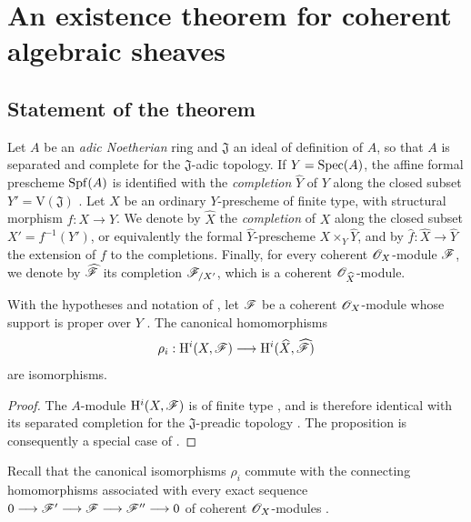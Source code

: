 \section{An existence theorem for coherent algebraic sheaves}
\label{section:III.5}


\subsection{Statement of the theorem}
\label{subsection:III.5.1}

\begin{env}[5.1.1]
\label{III.5.1.1}
Let $A$ be an \emph{adic Noetherian} ring and $\mathfrak{J}$ an ideal of
definition of $A$, so that $A$ is separated and complete for the
$\mathfrak{J}$-adic topology.  If $Y=\operatorname{Spec}(A)$, the affine formal
prescheme $\operatorname{Spf}(A)$ is identified with the \emph{completion}
$\widehat{Y}$ of $Y$ along the closed subset
$Y'=\mathrm{V}(\mathfrak{J})$ .  Let $X$ be an
ordinary $Y$-prescheme of finite type, with structural morphism
$f:X\to Y$.  We denote by $\widehat{X}$ the \emph{completion} of $X$ along
the closed subset $X'=f^{-1}(Y')$, or equivalently the formal
$\widehat{Y}$-prescheme $X\times_Y\widehat{Y}$, and by
$\widehat{f}:\widehat{X}\to\widehat{Y}$ the extension of $f$ to the
completions.  Finally, for every coherent $\mathscr{O}_X$-module
$\mathscr{F}$, we denote by $\widehat{\mathscr{F}}$ its completion
$\mathscr{F}_{/X'}$, which is a coherent
$\mathscr{O}_{\widehat{X}}$-module.
\end{env}

\begin{proposition}[5.1.2]
\label{III.5.1.2}
With the hypotheses and notation of , let $\mathscr{F}$
be a coherent $\mathscr{O}_X$-module whose support is proper over $Y$
.  The canonical homomorphisms
\[
  \rho_i:
  \mathrm{H}^i(X,\mathscr{F})
  \longrightarrow
  \mathrm{H}^i(\widehat{X},\widehat{\mathscr{F}})
\]
are isomorphisms.
\end{proposition}

\begin{proof}
The $A$-module $\mathrm{H}^i(X,\mathscr{F})$ is of finite type
, and is therefore identical with its separated
completion for the $\mathfrak{J}$-preadic topology
.  The proposition is consequently a special case
of .
\end{proof}

Recall that the canonical isomorphisms $\rho_i$ commute with the
connecting homomorphisms associated with every exact sequence $0\longrightarrow\mathscr{F}'
\longrightarrow\mathscr{F}
\longrightarrow\mathscr{F}''
\longrightarrow0$
of coherent $\mathscr{O}_X$-modules
 .

